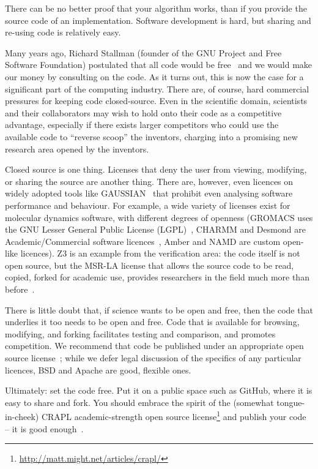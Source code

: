 \documentclass[10pt,conference,final]{IEEEtran}
\begin{document}
There can be no better proof that your algorithm works, than if you
provide the source code of an implementation. Software development is
hard, but sharing and re-using code is relatively easy.

Many years ago, Richard Stallman (founder of the GNU Project and Free
Software Foundation) postulated that all code would be
free~\cite{rms:2010} and we would make our money by consulting on the
code.  As it turns out, this is now the case for a significant
part of the computing industry. There are, of course, hard commercial
pressures for keeping code closed-source. Even in the scientific
domain, scientists and their collaborators may wish to hold onto their
code as a competitive advantage, especially if there exists larger
competitors who could use the available code to ``reverse scoop'' the
inventors, charging into a promising new research area opened by the
inventors.

Closed source is one thing. Licenses that deny the user from viewing,
modifying, or sharing the source are another thing. There are,
however, even licences on widely adopted tools like
GAUSSIAN~\cite{Giles2004} that prohibit even analysing software
performance and behaviour. For example, a wide variety of licenses
exist for molecular dynamics software, with different degrees of
openness (GROMACS uses the GNU Lesser General Public License
(LGPL)~\cite{Hess2008}, CHARMM and Desmond are Academic/Commercial
software licences~\cite{Brooks2009,Bowers2006}, Amber and NAMD are
custom open-like licences). Z3 is an example from the verification
area: the code itself is not open source, but the MSR-LA license that allows
the source code to be read, copied, forked for academic use, provides
researchers in the field much more than
before~\cite{deMoura2012Z3open}.
 

 There is little
doubt that, if science wants to be open and free, then the code that
underlies it too needs to be open and free. Code that is available for
browsing, modifying, and forking facilitates testing and comparison,
and promotes competition. We recommend that code be published under an
appropriate open source license~\cite{osl}; while we defer legal
discussion of the specifics of any particular licences, BSD and Apache are good,
flexible ones.

Ultimately: set the code free. Put it on a public space such as
GitHub, where it is easy to share and fork. You should embrace the
spirit of the (somewhat tongue-in-cheek) CRAPL academic-strength open
source license\footnote{\url{http://matt.might.net/articles/crapl/}}
and publish your code -- it is good enough~\cite{barnes:2010}.
\end{document}
